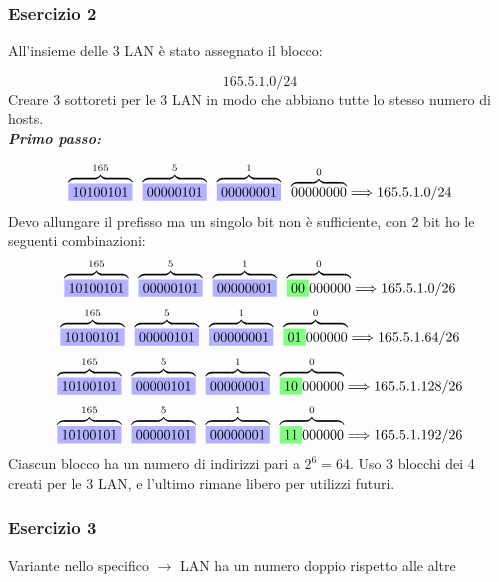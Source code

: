 \documentclass[12pt]{article}
\begin{document}
\subsubsection{Esercizio 2}

All'insieme delle 3 LAN è stato assegnato il blocco:

\[165.5.1.0/24\]
Creare 3 sottoreti per le 3 LAN in modo che abbiano tutte lo stesso numero di hosts.\\
\textbf{\textit{Primo passo:}}

\[\overbrace{\colorbox{blue!30!white}{10100101}}^{165} \; \; \overbrace{\colorbox{blue!30!white}{00000101}}^{5} \; \; \overbrace{\colorbox{blue!30!white}{00000001}}^{1} \; \; \overbrace{00000000}^{0} \Longrightarrow 165.5.1.0/24\]
Devo allungare il prefisso ma un singolo bit non è sufficiente, con 2 bit ho le seguenti combinazioni: 
\[\overbrace{\colorbox{blue!30!white}{10100101}}^{165} \; \; \overbrace{\colorbox{blue!30!white}{00000101}}^{5} \; \; \overbrace{\colorbox{blue!30!white}{00000001}}^{1} \; \; \overbrace{\colorbox{green!50!white}{00}000000}^{0} \Longrightarrow 165.5.1.0/26\]
\[\overbrace{\colorbox{blue!30!white}{10100101}}^{165} \; \; \overbrace{\colorbox{blue!30!white}{00000101}}^{5} \; \; \overbrace{\colorbox{blue!30!white}{00000001}}^{1} \; \; \overbrace{\colorbox{green!50!white}{01}000000}^{0} \Longrightarrow 165.5.1.64/26\]
\[\overbrace{\colorbox{blue!30!white}{10100101}}^{165} \; \; \overbrace{\colorbox{blue!30!white}{00000101}}^{5} \; \; \overbrace{\colorbox{blue!30!white}{00000001}}^{1} \; \; \overbrace{\colorbox{green!50!white}{10}000000}^{0} \Longrightarrow 165.5.1.128/26\]
\[\overbrace{\colorbox{blue!30!white}{10100101}}^{165} \; \; \overbrace{\colorbox{blue!30!white}{00000101}}^{5} \; \; \overbrace{\colorbox{blue!30!white}{00000001}}^{1} \; \; \overbrace{\colorbox{green!50!white}{11}000000}^{0} \Longrightarrow 165.5.1.192/26\]
Ciascun blocco ha un numero di indirizzi pari a $2^6 = 64$. Uso 3 blocchi dei 4 creati per le 3 LAN, e l'ultimo rimane libero per utilizzi futuri.

\subsubsection{Esercizio 3}
Variante nello specifico $\rightarrow$ LAN ha un numero doppio rispetto alle altre 
\end{document}
